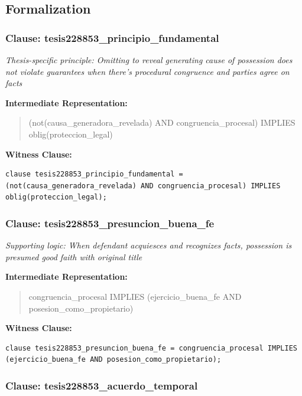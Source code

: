\documentclass[11pt,a4paper]{article}
\begin{document}
\subsection{Formalization}

\subsubsection{Clause: tesis228853\_principio\_fundamental}

\textit{Thesis-specific principle: Omitting to reveal generating cause of possession does not violate guarantees when there's procedural congruence and parties agree on facts}

\textbf{Intermediate Representation:}

\begin{quote}
(not(causa\_generadora\_revelada) AND congruencia\_procesal) IMPLIES oblig(proteccion\_legal)
\end{quote}

\textbf{Witness Clause:}

\begin{lstlisting}[style=witnessstyle, language=Witness]
clause tesis228853_principio_fundamental = (not(causa_generadora_revelada) AND congruencia_procesal) IMPLIES oblig(proteccion_legal);
\end{lstlisting}

\subsubsection{Clause: tesis228853\_presuncion\_buena\_fe}

\textit{Supporting logic: When defendant acquiesces and recognizes facts, possession is presumed good faith with original title}

\textbf{Intermediate Representation:}

\begin{quote}
congruencia\_procesal IMPLIES (ejercicio\_buena\_fe AND posesion\_como\_propietario)
\end{quote}

\textbf{Witness Clause:}

\begin{lstlisting}[style=witnessstyle, language=Witness]
clause tesis228853_presuncion_buena_fe = congruencia_procesal IMPLIES (ejercicio_buena_fe AND posesion_como_propietario);
\end{lstlisting}

\subsubsection{Clause: tesis228853\_acuerdo\_temporal}
\end{document}
